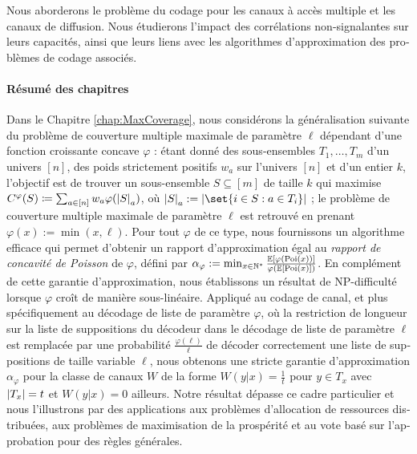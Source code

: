 \begin{otherlanguage}{french}
Nous aborderons le problème du codage pour les canaux à accès multiple et les canaux de diffusion. Nous étudierons l'impact des corrélations non-signalantes sur leurs capacités, ainsi que leurs liens avec les algorithmes d'approximation des problèmes de codage associés.

\paragraph{Résumé des chapitres} Dans le Chapitre \ref{chap:MaxCoverage}, nous considérons la généralisation suivante du problème de couverture multiple maximale de paramètre $\ell$ dépendant d'une fonction croissante concave $\varphi$ : étant donné des sous-ensembles $T_1, \ldots, T_m$ d'un univers $[n]$, des poids strictement positifs $w_a$ sur l'univers $[n]$ et d'un entier $k$, l'objectif est de trouver un sous-ensemble $S \subseteq [m]$ de taille $k$ qui maximise $C^{\varphi}(S) \coloneqq \sum_{a \in [n]}w_a\varphi(\abs{S}_a)$, où $\abs{S}_a : = \abs{\set{i \in S : a \in T_i}}$ ; le problème de couverture multiple maximale de paramètre $\ell$ est retrouvé en prenant $\varphi(x) := \min(x,\ell)$. Pour tout $\varphi$ de ce type, nous fournissons un algorithme efficace qui permet d'obtenir un rapport d'approximation égal au \emph{rapport de concavité de Poisson} de $\varphi$, défini par $\alpha_{\varphi} := \min_{x \in \mathbb{N}^*} \frac{\mathbb{E}[\varphi(\operatorname{\text{Poi}}(x))]}{\varphi(\mathbb{E}[\operatorname{\text{Poi}}(x)])}$. En complément de cette garantie d'approximation, nous établissons un résultat de \textrm{NP}-difficulté lorsque $\varphi$ croît de manière sous-linéaire. Appliqué au codage de canal, et plus spécifiquement au décodage de liste de paramètre $\varphi$, où la restriction de longueur sur la liste de suppositions du décodeur dans le décodage de liste de paramètre $\ell$ est remplacée par une probabilité $\frac{\varphi(\ell)}{\ell}$ de décoder correctement une liste de suppositions de taille variable $\ell$, nous obtenons une stricte garantie d'approximation $\alpha_{\varphi}$ pour la classe de canaux $W$ de la forme $W(y|x) = \frac{1}{t}$ pour $y \in T_x$ avec $\abs{T_x}=t$ et $W(y|x) = 0$ ailleurs. Notre résultat dépasse ce cadre particulier et nous l'illustrons par des applications aux problèmes d'allocation de ressources distribuées, aux problèmes de maximisation de la prospérité et au vote basé sur l'approbation pour des règles générales.


\end{otherlanguage}

